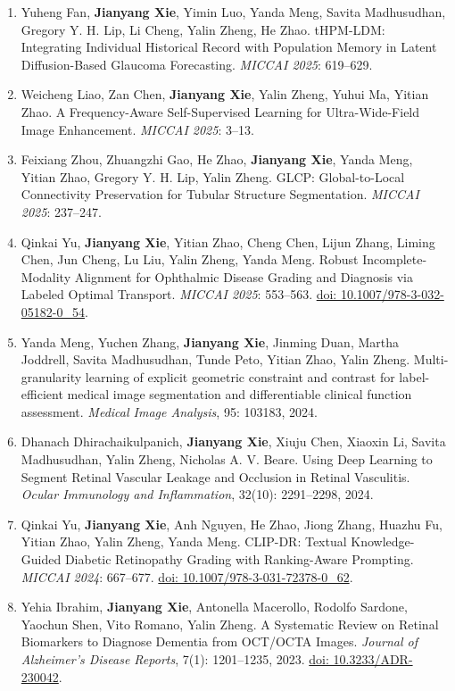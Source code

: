 \documentclass[11pt,a4paper]{article}
\begin{document}
\begin{enumerate}[label={\textcolor{accent}{\sffamily\footnotesize O\arabic*}},leftmargin=2.5em,itemsep=8pt,parsep=0pt]
\item Yuheng Fan, \textbf{Jianyang Xie}, Yimin Luo, Yanda Meng, Savita Madhusudhan, Gregory Y. H. Lip, Li Cheng, Yalin Zheng, He Zhao. tHPM-LDM: Integrating Individual Historical Record with Population Memory in Latent Diffusion-Based Glaucoma Forecasting. \textit{MICCAI 2025}: 619--629.
\item Weicheng Liao, Zan Chen, \textbf{Jianyang Xie}, Yalin Zheng, Yuhui Ma, Yitian Zhao. A Frequency-Aware Self-Supervised Learning for Ultra-Wide-Field Image Enhancement. \textit{MICCAI 2025}: 3--13.
\item Feixiang Zhou, Zhuangzhi Gao, He Zhao, \textbf{Jianyang Xie}, Yanda Meng, Yitian Zhao, Gregory Y. H. Lip, Yalin Zheng. GLCP: Global-to-Local Connectivity Preservation for Tubular Structure Segmentation. \textit{MICCAI 2025}: 237--247.
\item Qinkai Yu, \textbf{Jianyang Xie}, Yitian Zhao, Cheng Chen, Lijun Zhang, Liming Chen, Jun Cheng, Lu Liu, Yalin Zheng, Yanda Meng. Robust Incomplete-Modality Alignment for Ophthalmic Disease Grading and Diagnosis via Labeled Optimal Transport. \textit{MICCAI 2025}: 553--563. \href{https://doi.org/10.1007/978-3-032-05182-0_54}{doi: 10.1007/978-3-032-05182-0\_54}.
\item Yanda Meng, Yuchen Zhang, \textbf{Jianyang Xie}, Jinming Duan, Martha Joddrell, Savita Madhusudhan, Tunde Peto, Yitian Zhao, Yalin Zheng. Multi-granularity learning of explicit geometric constraint and contrast for label-efficient medical image segmentation and differentiable clinical function assessment. \textit{Medical Image Analysis}, 95: 103183, 2024.
\item Dhanach Dhirachaikulpanich, \textbf{Jianyang Xie}, Xiuju Chen, Xiaoxin Li, Savita Madhusudhan, Yalin Zheng, Nicholas A. V. Beare. Using Deep Learning to Segment Retinal Vascular Leakage and Occlusion in Retinal Vasculitis. \textit{Ocular Immunology and Inflammation}, 32(10): 2291--2298, 2024.
\item Qinkai Yu, \textbf{Jianyang Xie}, Anh Nguyen, He Zhao, Jiong Zhang, Huazhu Fu, Yitian Zhao, Yalin Zheng, Yanda Meng. CLIP-DR: Textual Knowledge-Guided Diabetic Retinopathy Grading with Ranking-Aware Prompting. \textit{MICCAI 2024}: 667--677. \href{https://doi.org/10.1007/978-3-031-72378-0_62}{doi: 10.1007/978-3-031-72378-0\_62}.
\item Yehia Ibrahim, \textbf{Jianyang Xie}, Antonella Macerollo, Rodolfo Sardone, Yaochun Shen, Vito Romano, Yalin Zheng. A Systematic Review on Retinal Biomarkers to Diagnose Dementia from OCT/OCTA Images. \textit{Journal of Alzheimer's Disease Reports}, 7(1): 1201--1235, 2023. \href{https://doi.org/10.3233/ADR-230042}{doi: 10.3233/ADR-230042}.

\end{enumerate}
\end{document}
